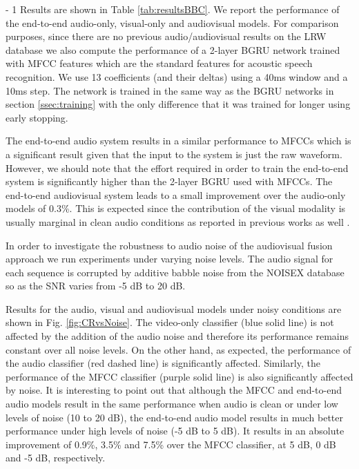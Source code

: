 \documentclass{article}
\begin{document}
\looseness - 1
Results are shown in Table \ref{tab:resultsBBC}. We report the performance of the end-to-end audio-only, visual-only and audiovisual models. For comparison purposes, since there are no previous audio/audiovisual results on the LRW database we also compute the performance of a 2-layer BGRU network trained with MFCC features which are the standard features for acoustic speech recognition. We use 13 coefficients (and their deltas) using a 40ms window and a 10ms step. The network is trained in the same way as the BGRU networks in section \ref{ssec:training} with the only difference that it was trained for longer using early stopping. 

The end-to-end audio system results in a similar performance to MFCCs which is a significant result given that the input to the system is just the raw waveform. However, we should note that the effort required in order to train the end-to-end system is significantly higher than the 2-layer BGRU used with MFCCs. The end-to-end audiovisual system leads to a small improvement over the audio-only models of 0.3\%. This is expected since the contribution of the visual modality is usually marginal in clean audio conditions as reported in previous works as well \cite{Potamianos2003,end2endAV}.

In order to investigate the robustness to audio noise of the
audiovisual fusion approach we run experiments under
varying noise levels. The audio signal for each sequence
is corrupted by additive babble noise from the NOISEX
database \cite{varga1993assessment} so as the SNR varies from -5 dB to 20 dB.


Results for the audio, visual and audiovisual models under noisy conditions are shown in Fig.  \ref{fig:CRvsNoise}. The
video-only classifier (blue solid line)
is not affected by the addition of the audio noise and
therefore its performance remains constant over all noise
levels. On the other hand, as expected, the performance
of the audio classifier (red dashed line) is significantly affected. Similarly, the performance of the MFCC classifier (purple solid line) is also significantly affected by noise. It is interesting to point out that although the MFCC and end-to-end audio models result in the same performance when audio is clean or under low levels of noise (10 to 20 dB), the end-to-end audio model results in much better performance under high levels of noise (-5 dB to 5 dB). It results in an absolute improvement of 0.9\%, 3.5\% and 7.5\% over the MFCC classifier, at 5 dB, 0 dB and -5 dB, respectively.  
\end{document}
